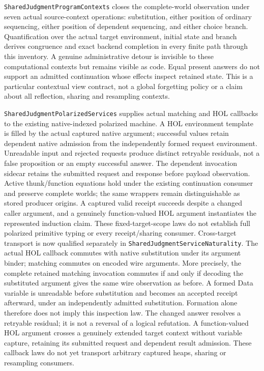 \documentclass[11pt]{article}
\theoremstyle{definition}
\theoremstyle{remark}
\begin{document}
\nolinkurl{SharedJudgmentProgramContexts} closes the complete-world
observation under seven actual source-context operations: substitution,
either position of ordinary sequencing, either position of dependent
sequencing, and either choice branch. Quantification over the actual target
environment, initial state and branch derives congruence and exact backend
completion in every finite path through this inventory. A genuine
administrative detour is invisible to these computational contexts but
remains visible as code. Equal present answers do not support an admitted
continuation whose effects inspect retained state. This is a particular
contextual view contract, not a global forgetting policy or a claim about
all reflection, sharing and resampling contexts.

\nolinkurl{SharedJudgmentPolarizedServices} supplies actual matching and
HOL callbacks to the existing native-indexed polarized machine. A HOL
environment template is filled by the actual captured native argument;
successful values retain dependent native admission from the independently
formed request environment. Unreadable input and rejected requests produce
distinct retryable residuals, not a false proposition or an empty successful
answer. The dependent invocation sidecar retains the submitted request and
response before payload observation. Active thunk/function equations hold
under the existing continuation consumer and preserve complete worlds; the
same wrappers remain distinguishable as stored producer origins. A captured
valid receipt succeeds despite a changed caller argument, and a genuinely
function-valued HOL argument instantiates the represented induction claim.
These fixed-target-scope laws do not establish full polarized primitive
typing or every receipt/sharing consumer. Cross-target transport is now
qualified separately in \nolinkurl{SharedJudgmentServiceNaturality}. The
actual HOL callback commutes with native substitution under its argument
binder; matching commutes on encoded wire arguments. More precisely, the
complete retained matching invocation commutes if and only if decoding
the substituted argument gives the same wire observation as before. A
formed Data variable is unreadable before substitution and becomes an
accepted receipt afterward, under an independently admitted substitution.
Formation alone therefore does not imply this inspection law. The changed
answer resolves a retryable residual; it is not a reversal of a logical
refutation. A function-valued HOL argument crosses a genuinely extended
target context without variable capture, retaining its submitted request
and dependent result admission. These callback laws do not yet transport
arbitrary captured heaps, sharing or resampling consumers.
\end{document}
